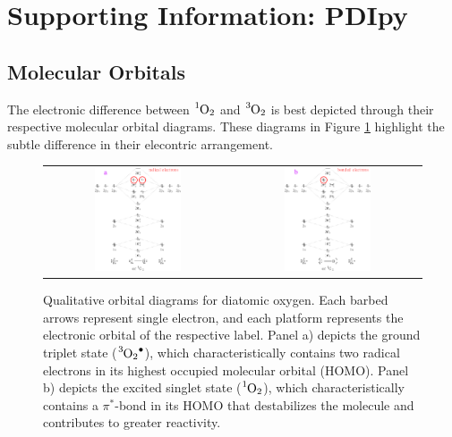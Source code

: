 \section{Supporting Information: PDIpy}

\subsection{Molecular Orbitals}
The electronic difference between $\ce{^1O2}$ and $\ce{^3O2}$ is best depicted through their respective molecular orbital diagrams. These diagrams in Figure \ref{mo_diagrams} highlight the subtle difference in their elecontric arrangement.

\begin{figure}
    \centering
    \begin{tabular}{c|c}
        \includegraphics[width = 0.48\textwidth]{images/PDIpy/background/triplet_mo_diagram.png}
        & \includegraphics[width = 0.48\textwidth]{images/PDIpy/background/singlet_mo_diagram.png}
    \end{tabular}
    \caption{
        Qualitative orbital diagrams for diatomic oxygen. Each barbed arrows represent single electron, and each platform represents the electronic orbital of the respective label. Panel a) depicts the ground triplet state ($\ce{^3O2^.}$), which characteristically contains two radical electrons in its highest occupied molecular orbital (HOMO). Panel b) depicts the excited singlet state ($\ce{^1O2}$), which characteristically contains a $\pi^*$-bond in its HOMO that destabilizes the molecule and contributes to greater reactivity.
    }
    \label{mo_diagrams}
\end{figure}


